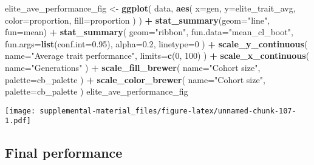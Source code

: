 \documentclass[]{book}
\newenvironment{Shaded}{\begin{snugshade}}{\end{snugshade}}
\newcommand{\DataTypeTok}[1]{\textcolor[rgb]{0.13,0.29,0.53}{#1}}
\newcommand{\DecValTok}[1]{\textcolor[rgb]{0.00,0.00,0.81}{#1}}
\newcommand{\FloatTok}[1]{\textcolor[rgb]{0.00,0.00,0.81}{#1}}
\newcommand{\KeywordTok}[1]{\textcolor[rgb]{0.13,0.29,0.53}{\textbf{#1}}}
\newcommand{\NormalTok}[1]{#1}
\newcommand{\OperatorTok}[1]{\textcolor[rgb]{0.81,0.36,0.00}{\textbf{#1}}}
\newcommand{\StringTok}[1]{\textcolor[rgb]{0.31,0.60,0.02}{#1}}
\begin{document}
\begin{Shaded}
\begin{Highlighting}[]
\NormalTok{elite_ave_performance_fig <-}
\StringTok{  }\KeywordTok{ggplot}\NormalTok{(}
\NormalTok{    data,}
    \KeywordTok{aes}\NormalTok{(}
      \DataTypeTok{x=}\NormalTok{gen,}
      \DataTypeTok{y=}\NormalTok{elite_trait_avg,}
      \DataTypeTok{color=}\NormalTok{proportion,}
      \DataTypeTok{fill=}\NormalTok{proportion}
\NormalTok{    )}
\NormalTok{  ) }\OperatorTok{+}
\StringTok{  }\KeywordTok{stat_summary}\NormalTok{(}\DataTypeTok{geom=}\StringTok{"line"}\NormalTok{, }\DataTypeTok{fun=}\NormalTok{mean) }\OperatorTok{+}
\StringTok{  }\KeywordTok{stat_summary}\NormalTok{(}
    \DataTypeTok{geom=}\StringTok{"ribbon"}\NormalTok{,}
    \DataTypeTok{fun.data=}\StringTok{"mean_cl_boot"}\NormalTok{,}
    \DataTypeTok{fun.args=}\KeywordTok{list}\NormalTok{(}\DataTypeTok{conf.int=}\FloatTok{0.95}\NormalTok{),}
    \DataTypeTok{alpha=}\FloatTok{0.2}\NormalTok{,}
    \DataTypeTok{linetype=}\DecValTok{0}
\NormalTok{  ) }\OperatorTok{+}
\StringTok{  }\KeywordTok{scale_y_continuous}\NormalTok{(}
    \DataTypeTok{name=}\StringTok{"Average trait performance"}\NormalTok{,}
    \DataTypeTok{limits=}\KeywordTok{c}\NormalTok{(}\DecValTok{0}\NormalTok{, }\DecValTok{100}\NormalTok{)}
\NormalTok{  ) }\OperatorTok{+}
\StringTok{  }\KeywordTok{scale_x_continuous}\NormalTok{(}
    \DataTypeTok{name=}\StringTok{"Generations"}
\NormalTok{  ) }\OperatorTok{+}
\StringTok{  }\KeywordTok{scale_fill_brewer}\NormalTok{(}
    \DataTypeTok{name=}\StringTok{"Cohort size"}\NormalTok{,}
    \DataTypeTok{palette=}\NormalTok{cb_palette}
\NormalTok{  ) }\OperatorTok{+}
\StringTok{  }\KeywordTok{scale_color_brewer}\NormalTok{(}
    \DataTypeTok{name=}\StringTok{"Cohort size"}\NormalTok{,}
    \DataTypeTok{palette=}\NormalTok{cb_palette}
\NormalTok{  )}
\NormalTok{elite_ave_performance_fig}
\end{Highlighting}
\end{Shaded}

\texttt{[image: supplemental-material\_files/figure-latex/unnamed-chunk-107-1.pdf]}

\hypertarget{final-performance-9}{%
\subsection{Final performance}\label{final-performance-9}}
\end{document}
